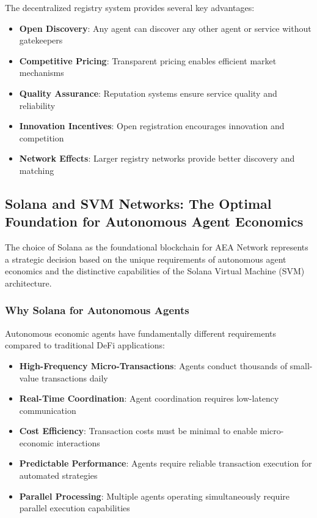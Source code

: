 \documentclass[12pt,a4paper]{article}
\begin{document}
The decentralized registry system provides several key advantages:

\begin{itemize}
\item \textbf{Open Discovery}: Any agent can discover any other agent or service without gatekeepers
\item \textbf{Competitive Pricing}: Transparent pricing enables efficient market mechanisms
\item \textbf{Quality Assurance}: Reputation systems ensure service quality and reliability
\item \textbf{Innovation Incentives}: Open registration encourages innovation and competition
\item \textbf{Network Effects}: Larger registry networks provide better discovery and matching
\end{itemize}

\subsection{Solana and SVM Networks: The Optimal Foundation for Autonomous Agent Economics}

The choice of Solana as the foundational blockchain for AEA Network represents a strategic decision based on the unique requirements of autonomous agent economics and the distinctive capabilities of the Solana Virtual Machine (SVM) architecture.

\subsubsection{Why Solana for Autonomous Agents}

Autonomous economic agents have fundamentally different requirements compared to traditional DeFi applications:

\begin{itemize}
\item \textbf{High-Frequency Micro-Transactions}: Agents conduct thousands of small-value transactions daily
\item \textbf{Real-Time Coordination}: Agent coordination requires low-latency communication
\item \textbf{Cost Efficiency}: Transaction costs must be minimal to enable micro-economic interactions
\item \textbf{Predictable Performance}: Agents require reliable transaction execution for automated strategies
\item \textbf{Parallel Processing}: Multiple agents operating simultaneously require parallel execution capabilities
\end{itemize}
\end{document}
